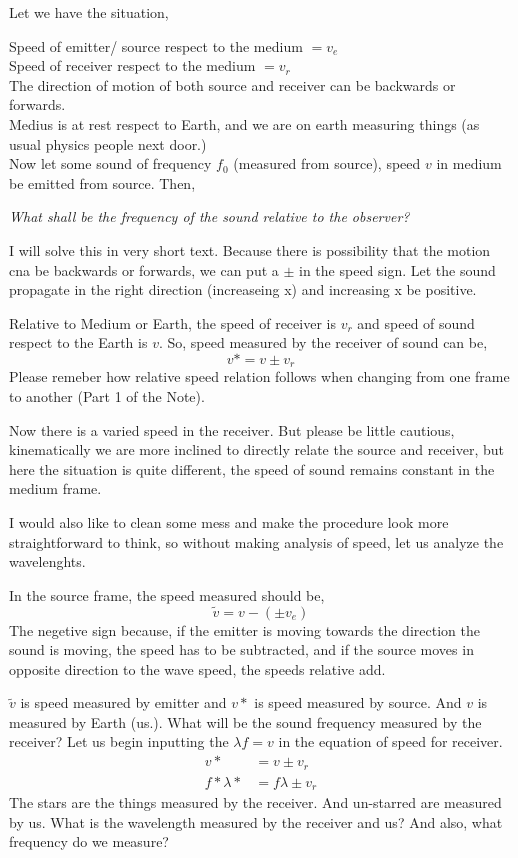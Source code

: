 \documentclass[a4paper]{article}
\begin{document}
Let we have the situation, 
\begin{tcolorbox}
    Speed of emitter/ source respect to the medium $= v_e$ \\
    Speed of receiver respect to the medium $= v_r$ \\
    The direction of motion of both source and receiver can be backwards or forwards. \\
    Medius is at rest respect to Earth, and we are on earth measuring things (as usual physics people next door.) \\
    Now let some sound of frequency $f_0$ (measured from source), speed $v$ in medium be emitted from source. Then, 

    \emph{What shall be the frequency of the sound relative to the observer?}
\end{tcolorbox} 
I will solve this in very short text. Because there is possibility that the motion cna be backwards or forwards, we can put a $ \pm $ 
in the speed sign. Let the sound propagate in the right direction (increaseing x) and increasing x be positive.

Relative to Medium or Earth, the speed of receiver is $v_r$ and speed of sound respect to the Earth is $v$. So, speed measured by the 
receiver of sound can be, 
\begin{equation}
v* = v \pm v_r
\end{equation} 
Please remeber how relative speed relation follows when changing from one frame to another (Part 1 of the Note). 

Now there is a varied speed in the receiver. But please be little cautious, kinematically we are more inclined to directly relate the source and receiver, 
but here the situation is quite different, the speed of sound remains constant in the medium frame. 

I would also like to clean some mess and make the procedure look more straightforward to think, so without making analysis of speed, let us analyze the wavelenghts.

In the source frame, the speed measured should be, 
\begin{equation}
\tilde{v} = v - (\pm v_e)
\end{equation} 
The negetive sign because, if the emitter is moving towards the direction the sound is moving, the speed has to be subtracted, and if the 
source moves in opposite direction to the wave speed, the speeds relative add. 

$\tilde{v}$ is speed measured by emitter and $v*$ is speed measured by source. And $v$ is measured by Earth (us.).
What will be the sound frequency measured by the receiver?
Let us begin inputting the $\lambda f = v$ in the equation of speed for receiver.
\begin{align}
    v* & = v \pm v_r \\
    f* \lambda* & = f \lambda \pm v_r 
\end{align} 
The stars are the things measured by the receiver. And un-starred are measured by us. What is the wavelength measured by the receiver and us? And also, what frequency do we measure? 
\end{document}
